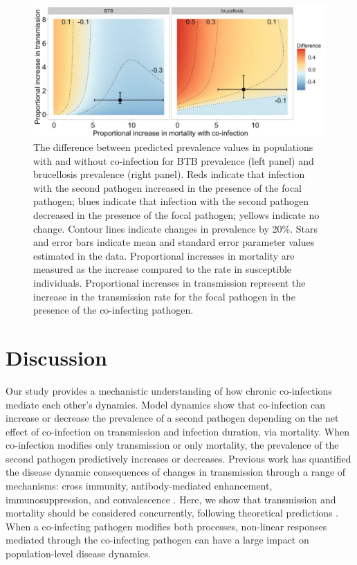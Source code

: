 \documentclass[10pt,letterpaper]{article}
\begin{document}
\begin{figure}%
\centering
\includegraphics[width=.99\linewidth]{Figure4_lowres.pdf}
\caption{The difference between predicted prevalence values in populations with and without co-infection for BTB prevalence (left panel) and brucellosis prevalence (right panel). Reds indicate that infection with the second pathogen increased in the presence of the focal pathogen; blues indicate that infection with the second pathogen decreased in the presence of the focal pathogen; yellows indicate no change. Contour lines indicate changes in prevalence by 20\%. Stars and error bars indicate mean and standard error parameter values estimated in the data. Proportional increases in mortality are measured as the increase compared to the rate in susceptible individuals. Proportional increases in transmission represent the increase in the transmission rate for the focal pathogen in the presence of the co-infecting pathogen.}
\label{fig:fig4}
\end{figure}


\section*{Discussion}
Our study provides a mechanistic understanding of how chronic co-infections mediate each other’s dynamics. Model dynamics show that co-infection can increase or decrease the prevalence of a second pathogen depending on the net effect of co-infection on transmission and infection duration, via mortality. When co-infection modifies only transmission or only mortality, the prevalence of the second pathogen predictively increases or decreases. Previous work has quantified the disease dynamic consequences of changes in transmission through a range of mechanisms: cross immunity, antibody-mediated enhancement, immunosuppression, and convalescence \cite{abu-raddad_impact_2004, rohani_population_1998, ferguson_effect_1999, bhattacharyya_cross-immunity_2015}. Here, we show that transmission and mortality should be considered concurrently, following theoretical predictions \cite{martcheva_role_2006, lloyd-smith_hiv-1/parasite_2008, fenton_dances_2013}. When a co-infecting pathogen modifies both processes, non-linear responses mediated through the co-infecting pathogen can have a large impact on population-level disease dynamics.
\end{document}

